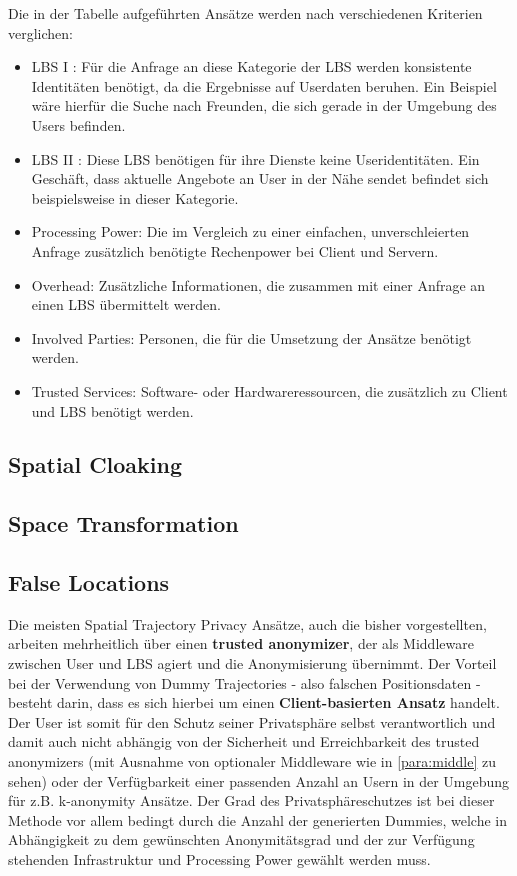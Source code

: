Die in der Tabelle aufgeführten Ansätze werden nach verschiedenen Kriterien verglichen:
\begin{itemize}
	\item LBS I \cite{Chow2011}: Für die Anfrage an diese Kategorie der LBS werden konsistente Identitäten benötigt, da die Ergebnisse auf Userdaten beruhen. Ein Beispiel wäre hierfür die Suche nach Freunden, die sich gerade in der Umgebung des Users befinden.
	\item LBS II \cite{Chow2011}: Diese LBS benötigen für ihre Dienste keine Useridentitäten. Ein Geschäft, dass aktuelle Angebote an User in der Nähe sendet befindet sich beispielsweise in dieser Kategorie.
	\item Processing Power: Die im Vergleich zu einer einfachen, unverschleierten Anfrage zusätzlich benötigte Rechenpower bei Client und Servern.
	\item Overhead: Zusätzliche Informationen, die zusammen mit einer Anfrage an einen LBS übermittelt werden.
	\item Involved Parties: Personen, die für die Umsetzung der Ansätze benötigt werden.
	\item Trusted Services: Software- oder Hardwareressourcen, die zusätzlich zu Client und LBS benötigt werden.
\end{itemize}

\subsection{Spatial Cloaking}

\subsection{Space Transformation}

\subsection{False Locations}
Die meisten Spatial Trajectory Privacy Ansätze, auch die bisher vorgestellten, arbeiten mehrheitlich über einen \textbf{trusted anonymizer}, der als Middleware zwischen User und LBS agiert und die Anonymisierung übernimmt. Der Vorteil bei der Verwendung von Dummy Trajectories - also falschen Positionsdaten - besteht darin, dass es sich hierbei um einen \textbf{Client-basierten Ansatz} handelt. Der User ist somit für den Schutz seiner Privatsphäre selbst verantwortlich und damit auch nicht abhängig von der Sicherheit und Erreichbarkeit des trusted anonymizers (mit Ausnahme von optionaler Middleware wie in \ref{para:middle} zu sehen) oder der Verfügbarkeit einer passenden Anzahl an Usern in der Umgebung für z.B. k-anonymity Ansätze. Der Grad des Privatsphäreschutzes ist bei dieser Methode vor allem bedingt durch die Anzahl der generierten Dummies, welche in Abhängigkeit zu dem gewünschten Anonymitätsgrad und der zur Verfügung stehenden Infrastruktur und Processing Power gewählt werden muss.

